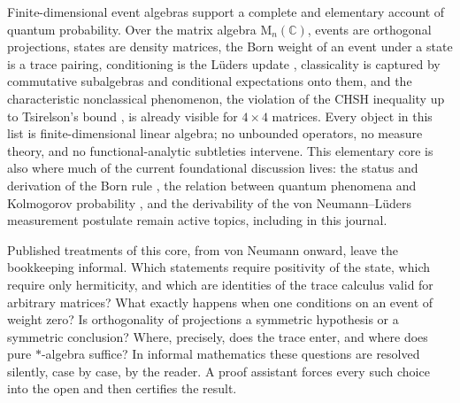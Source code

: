 \documentclass[11pt]{article}
\renewcommand{\_}{\textunderscore\allowbreak}
\theoremstyle{remark}
\newcommand{\C}{\mathbb C}
\newcommand{\Mn}{\mathrm{M}_n(\C)}
\begin{document}
Finite-dimensional event algebras support a complete and elementary account of quantum probability. Over the matrix algebra $\Mn$, events are orthogonal projections, states are density matrices, the Born weight of an event under a state is a trace pairing, conditioning is the L\"uders update \cite{lueders1950,buschlahti2009}, classicality is captured by commutative subalgebras and conditional expectations onto them, and the characteristic nonclassical phenomenon, the violation of the CHSH inequality up to Tsirelson's bound \cite{bell1964,chsh1969,tsirelson1980}, is already visible for $4 \times 4$ matrices. Every object in this list is finite-dimensional linear algebra; no unbounded operators, no measure theory, and no functional-analytic subtleties intervene. This elementary core is also where much of the current foundational discussion lives: the status and derivation of the Born rule \cite{reddigerpoirier2025,aharonovshushi2024}, the relation between quantum phenomena and Kolmogorov probability \cite{reddiger2026}, and the derivability of the von Neumann--L\"uders measurement postulate \cite{goldstein2026} remain active topics, including in this journal.

Published treatments of this core, from von Neumann \cite{vonneumann1932} onward, leave the bookkeeping informal. Which statements require positivity of the state, which require only hermiticity, and which are identities of the trace calculus valid for arbitrary matrices? What exactly happens when one conditions on an event of weight zero? Is orthogonality of projections a symmetric hypothesis or a symmetric conclusion? Where, precisely, does the trace enter, and where does pure $*$-algebra suffice? In informal mathematics these questions are resolved silently, case by case, by the reader. A proof assistant forces every such choice into the open and then certifies the result.
\end{document}
